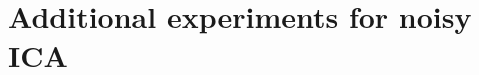 \documentclass[letterpaper]{article}
\newcommand{\bas}[1]{\begin{align*}#1\end{align*}}
\newcommand{\be}{\pmb{e}}
\newcommand{\bb}[1]{\left(#1\right)}
\begin{document}

\section{Additional experiments for noisy ICA}
\label{section:ica_additional_experiments}
\end{document}
